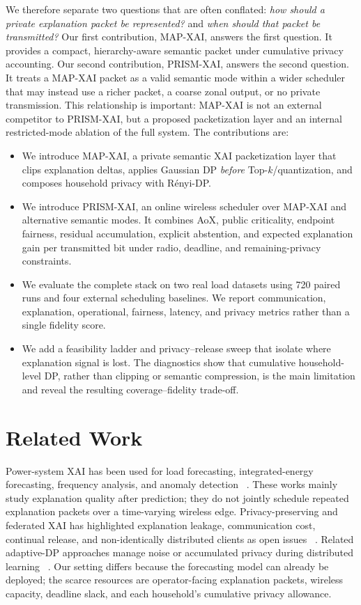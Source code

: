 \documentclass[conference]{IEEEtran}
\newcommand{\method}{PRISM-XAI}
\newcommand{\mapxai}{MAP-XAI}
\begin{document}
We therefore separate two questions that are often conflated:
\emph{how should a private explanation packet be represented?} and
\emph{when should that packet be transmitted?} Our first contribution,
\mapxai{}, answers the first question. It provides a compact,
hierarchy-aware semantic packet under cumulative privacy accounting. Our
second contribution, \method{}, answers the second question. It treats a
\mapxai{} packet as a valid semantic mode within a wider scheduler that
may instead use a richer packet, a coarse zonal output, or no private
transmission. This relationship is important: \mapxai{} is not an
external competitor to \method{}, but a proposed packetization layer and
an internal restricted-mode ablation of the full system.
The contributions are:
\begin{itemize}
\item We introduce \mapxai{}, a private semantic XAI packetization layer
that clips explanation deltas, applies Gaussian DP \emph{before}
Top-$k$/quantization, and composes household privacy with R\'enyi-DP.
\item We introduce \method{}, an online wireless scheduler over
\mapxai{} and alternative semantic modes. It combines AoX, public
criticality, endpoint fairness, residual accumulation, explicit
abstention, and expected explanation gain per transmitted bit under
radio, deadline, and remaining-privacy constraints.
\item We evaluate the complete stack on two real load datasets using 720
paired runs and four external scheduling baselines. We report
communication, explanation, operational, fairness, latency, and privacy
metrics rather than a single fidelity score.
\item We add a feasibility ladder and privacy--release sweep that isolate
where explanation signal is lost. The diagnostics show that cumulative
household-level DP, rather than clipping or semantic compression, is the
main limitation and reveal the resulting coverage--fidelity trade-off.
\end{itemize}

\section{Related Work}

Power-system XAI has been used for load forecasting, integrated-energy
forecasting, frequency analysis, and anomaly detection
~\cite{bolstad2022load,wu2022load,kruse2021frequency,gebhard2025anomaly}.
These works mainly study explanation quality after prediction; they do
not jointly schedule repeated explanation packets over a time-varying
wireless edge. Privacy-preserving and federated XAI has highlighted
explanation leakage, communication cost, continual release, and
non-identically distributed clients as open issues
~\cite{gholizade2026fedxai}. Related adaptive-DP approaches manage noise
or accumulated privacy during distributed learning
~\cite{li2026fedsva,piran2025privatedfl}. Our setting differs because the
forecasting model can already be deployed; the scarce resources are
operator-facing explanation packets, wireless capacity, deadline slack,
and each household's cumulative privacy allowance.
\end{document}
